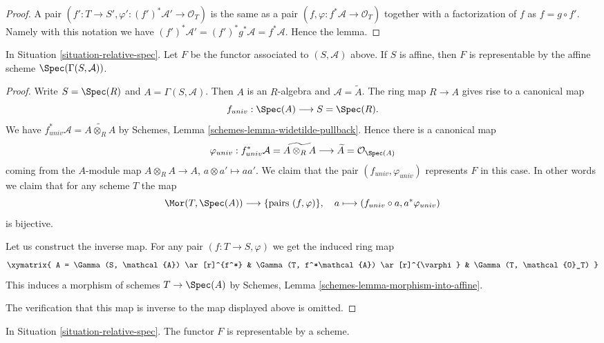 \begin{proof}
A pair $(f' : T \to S', \varphi' : (f')^*\mathcal{A}' \to \mathcal{O}_T)$
is the same as a pair $(f, \varphi : f^*\mathcal{A} \to \mathcal{O}_T)$
together with a factorization of $f$ as $f = g \circ f'$. Namely with
this notation we have
$(f')^* \mathcal{A}' = (f')^*g^*\mathcal{A} = f^*\mathcal{A}$.
Hence the lemma.
\end{proof}

\begin{lemma}
\label{lemma-spec-affine}
In Situation \ref{situation-relative-spec}.
Let $F$ be the functor associated to $(S, \mathcal{A})$ above.
If $S$ is affine, then $F$ is representable by the
affine scheme $\Spec(\Gamma(S, \mathcal{A}))$.
\end{lemma}

\begin{proof}
Write $S = \Spec(R)$ and $A = \Gamma(S, \mathcal{A})$.
Then $A$ is an $R$-algebra and $\mathcal{A} = \widetilde A$.
The ring map $R \to A$ gives rise to a canonical map
$$
f_{univ} : \Spec(A)
\longrightarrow
S = \Spec(R).
$$
We have
$f_{univ}^*\mathcal{A} =  \widetilde{A \otimes_R A}$
by Schemes, Lemma \ref{schemes-lemma-widetilde-pullback}.
Hence there is a canonical map
$$
\varphi_{univ} :
f_{univ}^*\mathcal{A} = \widetilde{A \otimes_R A}
\longrightarrow
\widetilde A = \mathcal{O}_{\Spec(A)}
$$
coming from the $A$-module map $A \otimes_R A \to A$,
$a \otimes a' \mapsto aa'$. We claim that the pair
$(f_{univ}, \varphi_{univ})$ represents $F$ in this case.
In other words we claim that for any scheme $T$ the map
$$
\Mor(T, \Spec(A)) \longrightarrow \{\text{pairs } (f, \varphi)\},\quad
a \longmapsto (f_{univ} \circ a, a^*\varphi_{univ})
$$
is bijective.

\medskip\noindent
Let us construct the inverse map.
For any pair $(f : T \to S, \varphi)$ we get the induced
ring map
$$
\xymatrix{
A = \Gamma(S, \mathcal{A}) \ar[r]^{f^*} &
\Gamma(T, f^*\mathcal{A}) \ar[r]^{\varphi} &
\Gamma(T, \mathcal{O}_T)
}
$$
This induces a morphism of schemes $T \to \Spec(A)$
by Schemes, Lemma \ref{schemes-lemma-morphism-into-affine}.

\medskip\noindent
The verification that this map is inverse to the map
displayed above is omitted.
\end{proof}

\begin{lemma}
\label{lemma-spec}
In Situation \ref{situation-relative-spec}.
The functor $F$ is representable by a scheme.
\end{lemma}

